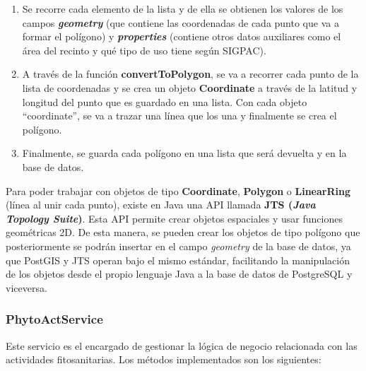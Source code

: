 \begin{itemize}
\begin{enumerate}
        \item Se recorre cada elemento de la lista y de ella se obtienen los valores de los campos \textbf{\textit{geometry}} (que contiene las coordenadas
        de cada punto que va a formar el polígono) y \textbf{\textit{properties}} (contiene otros datos auxiliares como el área del recinto y qué tipo de uso
        tiene según SIGPAC).

        \item A través de la función \textbf{convertToPolygon}, se va a recorrer cada punto de la lista de coordenadas y se crea un objeto \textbf{Coordinate} a través
        de la latitud y longitud del punto que es guardado en una lista. Con cada objeto ``coordinate'', se va a trazar una línea que los una y finalmente se crea el polígono.

        \item Finalmente, se guarda cada polígono en una lista que será devuelta y en la base de datos.
    \end{enumerate}
    
    Para poder trabajar con objetos de tipo \textbf{Coordinate}, \textbf{Polygon} o \textbf{LinearRing} (línea al unir cada punto), existe en Java una API llamada
    \textbf{JTS (\textit{Java Topology Suite})}. Esta API permite crear objetos espaciales y usar funciones geométricas 2D. De esta manera, se pueden crear los objetos de tipo polígono
    que posteriormente se podrán insertar en el campo \textit{geometry} de la base de datos, ya que PostGIS y JTS operan bajo el mismo estándar, facilitando la manipulación de
    los objetos desde el propio lenguaje Java a la base de datos de PostgreSQL y viceversa.
\end{itemize}

\subsubsection{PhytoActService}

Este servicio es el encargado de gestionar la lógica de negocio relacionada con las actividades fitosanitarias. Los métodos implementados son los siguientes:

